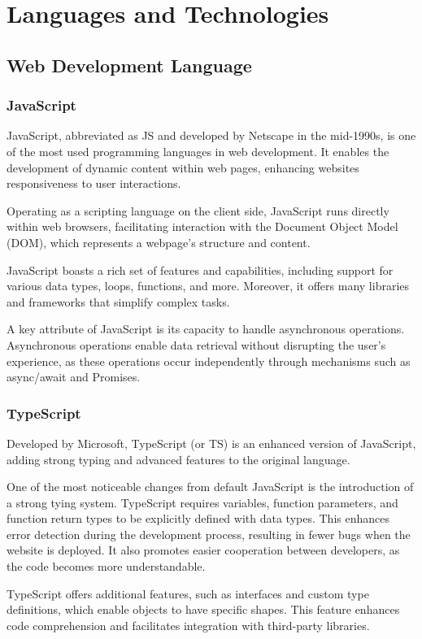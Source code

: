 \documentclass[12pt,oneside,openright,a4paper]{cpe-english-project}
\begin{document}
\section{Languages and Technologies}
  \subsection{Web Development Language}
    \subsubsection{JavaScript}
      \qquad JavaScript, abbreviated as JS and developed by Netscape in the mid-1990s, is one of the most used programming languages in web development. It enables the development of dynamic content within web pages, enhancing websites responsiveness to user interactions.\par
      \qquad Operating as a scripting language on the client side, JavaScript runs directly within web browsers, facilitating interaction with the Document Object Model (DOM), which represents a webpage's structure and content.\par
      \qquad JavaScript boasts a rich set of features and capabilities, including support for various data types, loops, functions, and more. Moreover, it offers many libraries and frameworks that simplify complex tasks.\par
      \qquad A key attribute of JavaScript is its capacity to handle asynchronous operations. Asynchronous operations enable data retrieval without disrupting the user’s experience, as these operations occur independently through mechanisms such as async/await and Promises.\par
    \subsubsection{TypeScript}
      \qquad Developed by Microsoft, TypeScript (or TS) is an enhanced version of JavaScript, adding strong typing and advanced features to the original language.\par
      \qquad One of the most noticeable changes from default JavaScript is the introduction of a strong tying system. TypeScript requires variables, function parameters, and function return types to be explicitly defined with data types. This enhances error detection during the development process, resulting in fewer bugs when the website is deployed. It also promotes easier cooperation between developers, as the code becomes more understandable.\par
      \qquad TypeScript offers additional features, such as interfaces and custom type definitions, which enable objects to have specific shapes. This feature enhances code comprehension and facilitates integration with third-party libraries.\par
    
\end{document}

